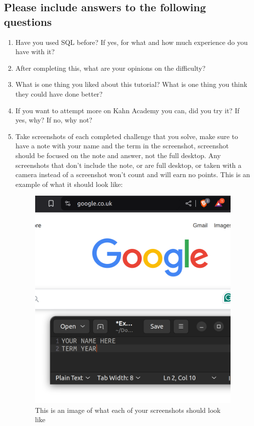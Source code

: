 \documentclass[12pt]{article}
\begin{document}
\subsection*{Please include answers to the following questions}
    \begin{enumerate}
        \item Have you used SQL before? If yes, for what and how much experience do you have with it?
        \item After completing this, what are your opinions on the difficulty? 
        \item What is one thing you liked about this tutorial? What is one thing you think they could have done better?
        \item If you want to attempt more on Kahn Academy you can, did you try it? If yes, why? If no, why not?
        \item Take screenshots of each completed challenge that you solve, make sure to have a note with your name and the term in the screenshot, screenshot should be focused on the note and answer, not the full desktop.  Any screenshots that don't include the note, or are full desktop, or taken with a camera instead of a screenshot won't count and will earn no points. This is an example of what it should look like:        
 
        \begin{figure}[h!]
            \centerline{\includegraphics[scale=.2]{ExampleScreenshot.png}}
            \caption{This is an image of what each of your screenshots should look like}

            \end{figure} 
    \end{enumerate}
\end{document}
